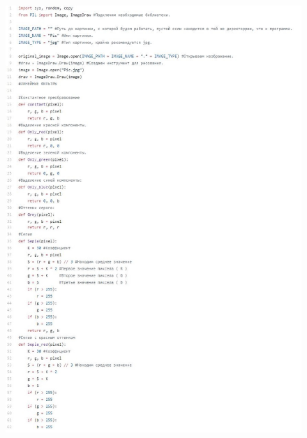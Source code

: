 \documentclass[a4paper,12pt]{article}
\begin{document}
\newpage
\begin{figure}
\begin{center}
\begin{minipage}[h]{1.1\linewidth}
\includegraphics[width=1\linewidth]{code_1}
\end{minipage}
\end{center}

\end{figure}

\end{document}
